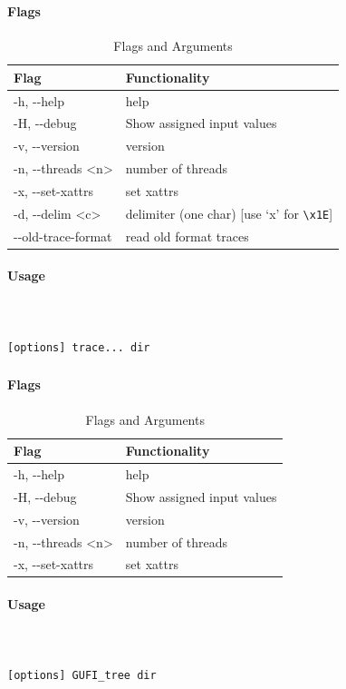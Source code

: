 \subsubsection{\gufitracedir}
\paragraph{Flags}
\begin{table} [H]
  \centering
  \begin{tabular}{|l|l|}
    \hline
    Flag & Functionality \\
    \hline
    -h, -{}-help & help \\
    \hline
    -H, -{}-debug & Show assigned input values \\
    \hline
    -v, -{}-version & version \\
    \hline
    -n, -{}-threads \textless n\textgreater & number of threads \\
    \hline
    -x, -{}-set-xattrs & set xattrs \\
    \hline
    -d, -{}-delim \textless c\textgreater & delimiter (one char)  [use `x' for \texttt{\textbackslash x1E}] \\
    \hline
    -{}-old-trace-format & read old format traces \\
    \hline
  \end{tabular}
  \caption{\gufitracedir Flags and Arguments}
\end{table}

\paragraph{Usage} ~\\\\
\gufitracedir \texttt{[options] trace... dir}

\subsubsection{\gufiindexdir}
\paragraph{Flags}
\begin{table} [H]
  \centering
  \begin{tabular}{l|l}
    \hline
    Flag & Functionality \\
    \hline
    -h, -{}-help & help \\
    \hline
    -H, -{}-debug & Show assigned input values \\
    \hline
    -v, -{}-version & version \\
    \hline
    -n, -{}-threads \textless n\textgreater & number of threads \\
    \hline
    -x, -{}-set-xattrs & set xattrs \\
    \hline
  \end{tabular}
  \caption{\gufiindexdir Flags and Arguments}
\end{table}

\paragraph{Usage} ~\\\\
\gufiindexdir \texttt{[options] GUFI\_tree dir}
